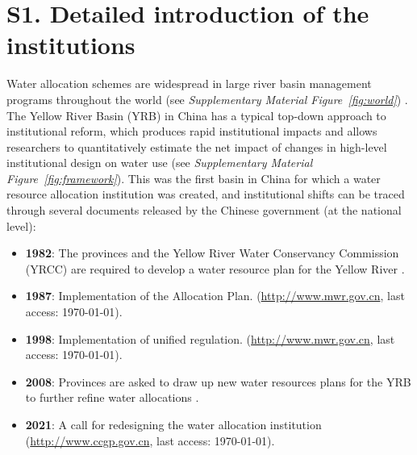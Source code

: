 \documentclass{article}
\begin{document}
\section*{S1. Detailed introduction of the institutions}
Water allocation schemes are widespread in large river basin management programs throughout the world (see \textit{Supplementary Material Figure~\ref{fig:world}}) \cite{speedBasinwaterallocation2013}.
The Yellow River Basin (YRB) in China has a typical top-down approach to institutional reform, which produces rapid institutional impacts and allows researchers to quantitatively estimate the net impact of changes in high-level institutional design on water use (see \textit{Supplementary Material Figure~\ref{fig:framework}}).
This was the first basin in China for which a water resource allocation institution was created, and institutional shifts can be traced through several documents released by the Chinese government (at the national level):
\begin{itemize}
    \item \textbf{1982}: The provinces and the Yellow River Water Conservancy Commission (YRCC) are required to develop a water resource plan for the Yellow River \cite{wangReviewImplementationYellow2019, wangThingsCurrentSignificance2019}.
    \item \textbf{1987}: Implementation of the Allocation Plan. (\href{http://www.gov.cn/zhengce/content/2011-03/30/content_3138.htm#}{http://www.mwr.gov.cn}, last access: \today).
    \item \textbf{1998}: Implementation of unified regulation. (\href{http://www.mwr.gov.cn/ztpd/2013ztbd/2013fxkh/fxkhswcbcs/cs/flfg/201304/t20130411_433489.html}{http://www.mwr.gov.cn}, last access: \today).
    \item \textbf{2008}: Provinces are asked to draw up new water resources plans for the YRB to further refine water allocations \cite{wangReviewImplementationYellow2019, wangThingsCurrentSignificance2019}.
    \item \textbf{2021}: A call for redesigning the water allocation institution (\href{http://www.ccgp.gov.cn/cggg/zygg/gkzb/202107/t20210721_16591901.htm}{http://www.ccgp.gov.cn}, last access: \today).
\end{itemize}
\end{document}
